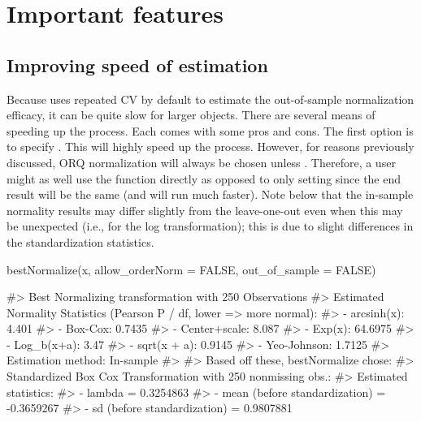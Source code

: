 \hypertarget{important-features}{%
\section{Important features}\label{important-features}}

\hypertarget{improving-speed-of-estimation}{%
\subsection{Improving speed of
estimation}\label{improving-speed-of-estimation}}

Because  uses repeated CV by default to estimate the
out-of-sample normalization efficacy, it can be quite slow for larger
objects. There are several means of speeding up the process. Each comes
with some pros and cons. The first option is to specify
. This will
highly speed up the process. However, for reasons previously discussed,
ORQ normalization will always be chosen unless
. Therefore, a user might
as well use the  function directly as opposed to only
setting  since
the end result will be the same (and  will run much
faster). Note below that the in-sample normality results may differ
slightly from the leave-one-out even when this may be unexpected (i.e.,
for the log transformation); this is due to slight differences in the
standardization statistics.

\begin{Schunk}
\begin{Sinput}
bestNormalize(x, allow_orderNorm = FALSE, out_of_sample = FALSE)
\end{Sinput}
\begin{Soutput}
#> Best Normalizing transformation with 250 Observations
#>  Estimated Normality Statistics (Pearson P / df, lower => more normal):
#>  - arcsinh(x): 4.401
#>  - Box-Cox: 0.7435
#>  - Center+scale: 8.087
#>  - Exp(x): 64.6975
#>  - Log_b(x+a): 3.47
#>  - sqrt(x + a): 0.9145
#>  - Yeo-Johnson: 1.7125
#> Estimation method: In-sample
#>  
#> Based off these, bestNormalize chose:
#> Standardized Box Cox Transformation with 250 nonmissing obs.:
#>  Estimated statistics:
#>  - lambda = 0.3254863 
#>  - mean (before standardization) = -0.3659267 
#>  - sd (before standardization) = 0.9807881
\end{Soutput}
\end{Schunk}

